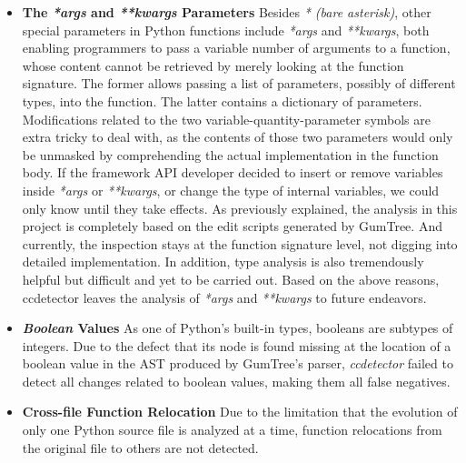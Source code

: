 \begin{itemize}
    \item \textbf{The \textit{*args} and \textit{**kwargs} Parameters} Besides \textit{* (bare asterisk)}, other special parameters in Python functions include \textit{*args} and \textit{**kwargs}, both enabling programmers to pass a variable number of arguments to a function, whose content cannot be retrieved by merely looking at the function signature. The former allows passing a list of parameters, possibly of different types, into the function. The latter contains a dictionary of parameters. Modifications related to the two variable-quantity-parameter symbols are extra tricky to deal with, as the contents of those two parameters would only be unmasked by comprehending the actual implementation in the function body. If the framework API developer decided to insert or remove variables inside \textit{*args} or \textit{**kwargs}, or change the type of internal variables, we could only know until they take effects.  As previously explained, the analysis in this project is completely based on the edit scripts generated by GumTree. And currently, the inspection stays at the function signature level, not digging into detailed implementation. In addition, type analysis is also tremendously helpful but difficult and yet to be carried out. Based on the above reasons, ccdetector leaves the analysis of \textit{*args} and \textit{**kwargs} to future endeavors.
    \item \textbf{\textit{Boolean} Values} As one of Python's built-in types, booleans are subtypes of integers. Due to the defect that its node is found missing at the location of a boolean value in the AST produced by GumTree's parser, \textit{ccdetector} failed to detect all changes related to boolean values, making them all false negatives.
    \item \textbf{Cross-file Function Relocation} Due to the limitation that the evolution of only one Python source file is analyzed at a time, function relocations from the original file to others are not detected.
\end{itemize}
